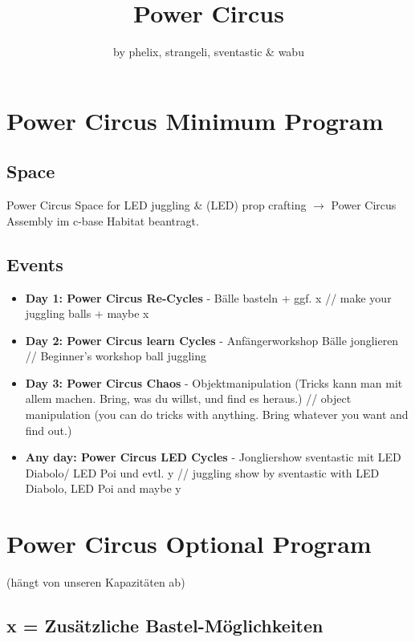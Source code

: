 \documentclass[a4]{article}
\title{Power Circus}
\author{by phelix, strangeli, sventastic \& wabu
}
\begin{document}
\maketitle


\section{Power Circus Minimum Program}

\subsection*{Space} Power Circus Space for LED juggling \& (LED) prop crafting $\rightarrow$ Power Circus Assembly im c-base Habitat beantragt.

\subsection*{Events}
\begin{itemize}
\item \textbf{Day 1: Power Circus Re-Cycles} - Bälle basteln + ggf. x // make your juggling balls + maybe x
\item\textbf{ Day 2: Power Circus learn Cycles} - Anfängerworkshop Bälle jonglieren // Beginner's workshop ball juggling
\item \textbf{Day 3:  Power Circus Chaos} - Objektmanipulation (Tricks kann man mit allem machen. Bring, was du willst, und find es heraus.) // object manipulation (you can do tricks with anything. Bring whatever you want and find out.)
\item \textbf{Any day: Power Circus LED Cycles} - Jongliershow sventastic mit LED Diabolo/ LED Poi und evtl. y // juggling show by sventastic with LED Diabolo, LED Poi and maybe y
\end{itemize}

\section{Power Circus Optional Program} 
(hängt von unseren Kapazitäten ab)
\subsection*{x = Zusätzliche Bastel-Möglichkeiten}  
 
\end{document}

